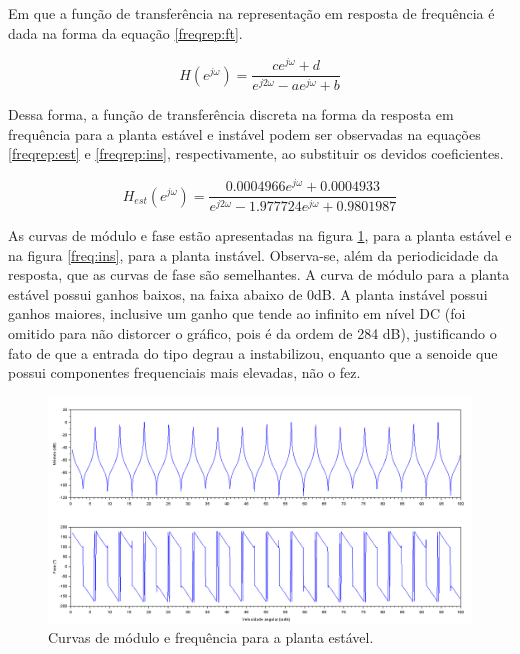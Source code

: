 Em que a função de transferência na representação em resposta de frequência é dada na forma da equação \ref{freqrep:ft}.

\begin{equation} \label{freqrep:ft}
    H(e^{j \omega}) = \frac{ce^{j \omega}+d}{e^{j 2\omega} - ae^{j \omega} + b}
\end{equation}

Dessa forma, a função de transferência discreta na forma da resposta em frequência para a planta estável e instável podem ser observadas na equações \ref{freqrep:est} e \ref{freqrep:ins}, respectivamente, ao substituir os devidos coeficientes.

\begin{equation} \label{freqrep:est}
    H_{est}(e^{j \omega}) = \frac{0.0004966e^{j \omega}+0.0004933}{e^{j 2\omega} - 1.977724e^{j \omega} + 0.9801987}
\end{equation}

As curvas de módulo e fase estão apresentadas na figura \ref{freq:est}, para a planta estável e na figura \ref{freq:ins}, para a planta instável. Observa-se, além da periodicidade da resposta, que as curvas de fase são semelhantes. A curva de módulo para a planta estável possui ganhos baixos, na faixa abaixo de 0dB. A planta instável possui ganhos maiores, inclusive um ganho que tende ao infinito em nível DC (foi omitido para não distorcer o gráfico, pois é da ordem de 284 dB), justificando o fato de que a entrada do tipo degrau a instabilizou, enquanto que a senoide que possui componentes frequenciais mais elevadas, não o fez.

\begin{figure}[H]
\begin{center}
\includegraphics[width=15cm]{images/freq/estavel_freq.png}
\caption{Curvas de módulo e frequência para a planta estável.}
\label{freq:est} 
\end{center}
\end{figure}

